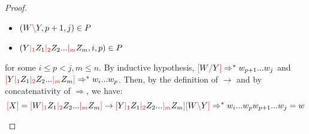 \documentclass[main.tex]{subfiles}
\begin{document}
\begin{proof}
\begin{enumerate}
\begin{itemize}
                \item $(W \textcolor{red}{\backslash} Y, p + 1, j) \in P$
                \item $(Y \textcolor{red}{|_{1}} Z_1 \textcolor{red}{|_{2}} Z_2 ... \textcolor{red}{|_{m}} Z_m, i, p) \in P$
            \end{itemize}
            for some $i \leq p < j, m \leq n$. By inductive hypothesis,
            $\textcolor{red}{[} W \textcolor{red}{/} Y \textcolor{red}{]} \Rightarrow^* w_{p + 1} ... w_j$
            and
            $\textcolor{red}{[} Y \textcolor{red}{|_{1}} Z_1 \textcolor{red}{|_{2}} Z_2 ... \textcolor{red}{|_{m}} Z_m \textcolor{red}{]} \Rightarrow^* w_i ... w_p$.
            Then, by the definition of $\rightarrow$ and by concatenativity of
            $\Rightarrow$, we have:
            \[
                \textcolor{red}{[} X \textcolor{red}{]} = \textcolor{red}{[} W \textcolor{red}{|_{1}} Z_1 \textcolor{red}{|_{2}} Z_2 ... \textcolor{red}{|_{m}} Z_m \textcolor{red}{]}
                \rightarrow
                \textcolor{red}{[} Y \textcolor{red}{|_{1}} Z_1 \textcolor{red}{|_{2}} Z_2 ... \textcolor{red}{|_{m}} Z_m \textcolor{red}{]} \textcolor{red}{[} W \textcolor{red}{\backslash} Y \textcolor{red}{]}
                \Rightarrow^*
                w_i ... w_p w_{p + 1} ... w_j = w
            \]
    \end{enumerate}
\end{proof}
\end{document}

